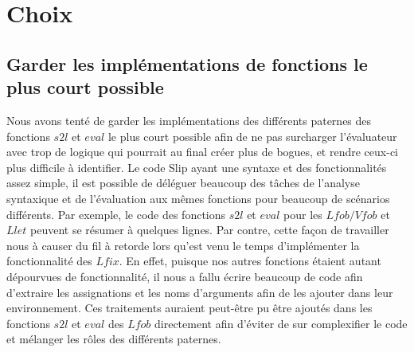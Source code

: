 \documentclass{article}
\begin{document}
	\section{Choix}

	\subsection{Garder les implémentations de fonctions le plus court possible}

	Nous avons tenté de garder les implémentations des différents paternes des
	fonctions $s2l$ et $eval$ le plus court possible afin de ne pas surcharger l'évaluateur
	avec trop de logique qui pourrait au final créer plus de bogues, et rendre ceux-ci
	plus difficile à identifier. Le code Slip ayant une syntaxe et des
	fonctionnalités assez simple, il est possible de déléguer beaucoup des tâches de
	l'analyse syntaxique et de l'évaluation aux mêmes fonctions pour beaucoup de scénarios
	différents. Par exemple, le code des fonctions $s2l$ et $eval$ pour les $Lfob/V
	fob$ et $Llet$ peuvent se résumer à quelques lignes. Par contre, cette façon de
	travailler nous à causer du fil à retorde lors qu’est venu le temps d'implémenter
	la fonctionnalité des $Lfix$. En effet, puisque nos autres fonctions étaient autant
	dépourvues de fonctionnalité, il nous a fallu écrire beaucoup de code afin d'extraire
	les assignations et les noms d'arguments afin de les ajouter dans leur
	environnement. Ces traitements auraient peut-être pu être ajoutés dans les fonctions
	$s2l$ et $eval$ des $Lfob$ directement afin d'éviter de sur complexifier le code
	et mélanger les rôles des différents paternes.
\end{document}
